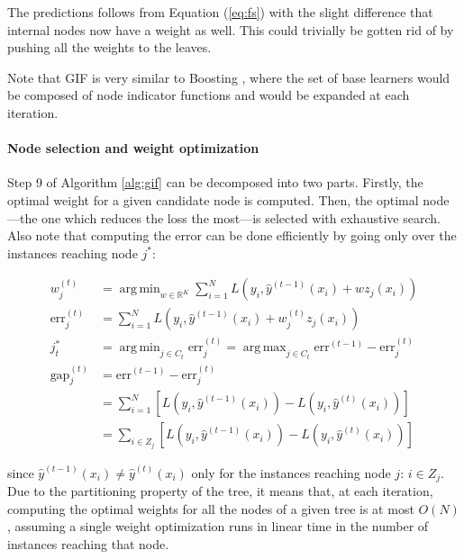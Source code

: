 \documentclass{article}
\DeclareMathOperator*{\argmin}{arg\,min}
\DeclareMathOperator*{\argmax}{arg\,max}
\begin{document}
The predictions follows from Equation (\ref{eq:fs}) with the slight difference 
that internal nodes now have a weight as well. This could trivially be gotten 
rid of by pushing all the weights to the leaves.


Note that GIF is very similar to Boosting \cite{hastie2009}, where the set of 
base learners would be composed of node indicator functions and would be 
expanded at each iteration.

\paragraph{Node selection and weight optimization}
Step 9 of Algorithm \ref{alg:gif} can be decomposed into two parts. Firstly, 
the optimal weight for a given candidate node is computed. Then, the optimal 
node---the one which reduces the loss the most---is selected with 
exhaustive search. Also note that computing the error can be done efficiently 
by going only over the instances reaching node $j^*$:

\begin{align}\label{eq:nodeSel}
w_j^{(t)} &= \argmin_{w \in \mathbb{R}^K} \sum_{i=1}^{N} L \left(y_i, 
\hat{y}^{(t-1)}(x_i) + w z_j(x_i)  \right) \\
\text{err}_j^{(t)} &= \sum_{i=1}^{N} L \left(y_i, \hat{y}^{(t-1)}(x_i) + 
w_j^{(t)} z_j(x_i)  \right) \\
j_t^* &= \argmin_{j \in C_t} \text{err}_j^{(t)} = \argmax_{j \in C_t} 
\text{err}^{(t-1)} - \text{err}_j^{(t)} \\
\text{gap}_j^{(t)} &= \text{err}^{(t-1)} - \text{err}_j^{(t)} \\
&= \sum_{i=1}^{N} \left[ L\left(y_i, \hat{y}^{(t-1)}(x_i)\right) - L\left(y_i, 
\hat{y}^{(t)}(x_i)\right) \right] \\
&= \sum_{i\in Z_j} \left[ L\left(y_i, \hat{y}^{(t-1)}(x_i)\right) - L\left(y_i, 
\hat{y}^{(t)}(x_i)\right) \right]
\end{align}

since $\hat{y}^{(t-1)}(x_i) \neq \hat{y}^{(t)}(x_i)$ only for the instances 
reaching node $j$: $i \in Z_j$. Due to the partitioning property of the tree, 
it means that, at each iteration, computing the optimal weights for all the 
nodes of a given tree is at most $O(N)$, assuming a single weight optimization 
runs in linear time in the number of instances reaching that node.
\end{document}
